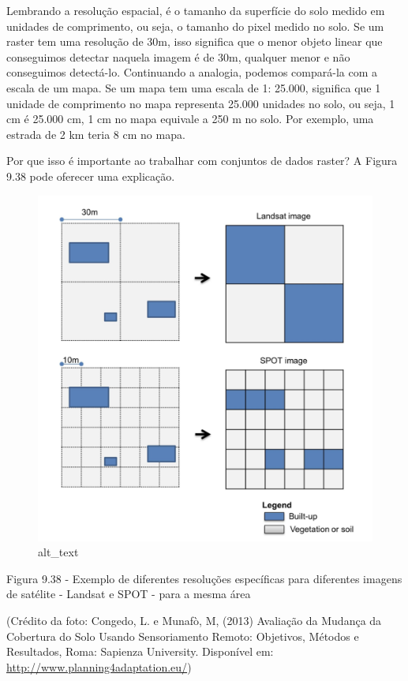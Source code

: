 \documentclass[
]{book}
\begin{document}
Lembrando a resolução espacial, é o tamanho da superfície do solo medido em unidades de comprimento, ou seja, o tamanho do pixel medido no solo. Se um raster tem uma resolução de 30m, isso significa que o menor objeto linear que conseguimos detectar naquela imagem é de 30m, qualquer menor e não conseguimos detectá-lo. Continuando a analogia, podemos compará-la com a escala de um mapa. Se um mapa tem uma escala de 1: 25.000, significa que 1 unidade de comprimento no mapa representa 25.000 unidades no solo, ou seja, 1 cm é 25.000 cm, 1 cm no mapa equivale a 250 m no solo. Por exemplo, uma estrada de 2 km teria 8 cm no mapa.

Por que isso é importante ao trabalhar com conjuntos de dados raster? A Figura 9.38 pode oferecer uma explicação.

\begin{figure}
\centering
\includegraphics{media/modulo9/fig938.png}
\caption{alt\_text}
\end{figure}

Figura 9.38 - Exemplo de diferentes resoluções específicas para diferentes imagens de satélite - Landsat e SPOT - para a mesma área

(Crédito da foto: Congedo, L. e Munafò, M, (2013) Avaliação da Mudança da Cobertura do Solo Usando Sensoriamento Remoto: Objetivos, Métodos e Resultados, Roma: Sapienza University. Disponível em: \url{http://www.planning4adaptation.eu/})
\end{document}
